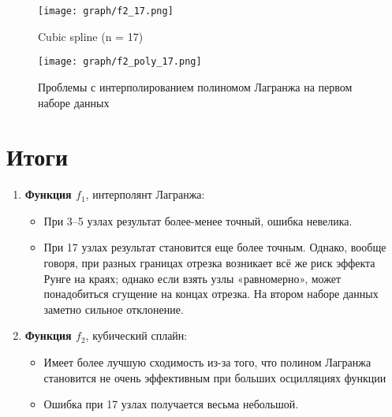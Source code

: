 \documentclass[a4paper, fleqn]{report}
\begin{document}
\begin{figure*}[h]
    \centering
    \begin{minipage}{0.8\textwidth}
        \centering
        \texttt{[image: graph/f2\_17.png]}
        \caption{Cubic spline (n = 17)}
    \end{minipage}%
\end{figure*}

\begin{figure*}[h]
    \centering
    \begin{minipage}{0.8\textwidth}
        \centering
        \texttt{[image: graph/f2\_poly\_17.png]}
        \caption{Проблемы с интерполированием полиномом Лагранжа на первом наборе данных}
    \end{minipage}%
\end{figure*}

\section*{Итоги}

\begin{enumerate}
    \item \textbf{Функция \(f_1\)}, интерполянт Лагранжа:
    \begin{itemize}
        \item При 3--5 узлах результат более-менее точный, ошибка невелика.
        \item При 17 узлах результат становится еще более точным. Однако, вообще говоря, при разных границах отрезка возникает всё же риск эффекта Рунге на краях; однако если взять узлы «равномерно», может понадобиться сгущение на концах отрезка. На втором наборе данных заметно сильное отклонение.
    \end{itemize}
    \item \textbf{Функция \(f_2\)}, кубический сплайн:
    \begin{itemize}
        \item Имеет более лучшую сходимость из-за того, что полином Лагранжа становится не очень эффективным при больших осцилляциях функции
        \item Ошибка при 17 узлах получается весьма небольшой.
    \end{itemize}
\end{enumerate}
\end{document}
